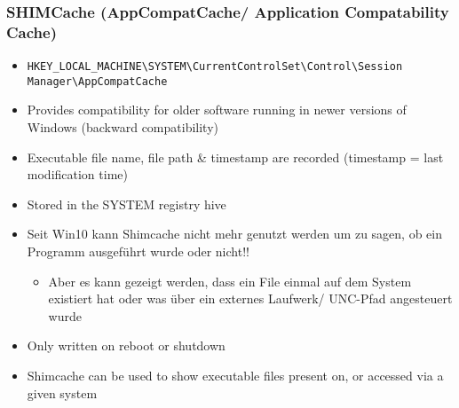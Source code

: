 \subsubsection{SHIMCache (AppCompatCache/ Application Compatability Cache)}
\begin{itemize}
    \item \lstinline|HKEY_LOCAL_MACHINE\SYSTEM\CurrentControlSet\Control\Session Manager\AppCompatCache|
    \item Provides compatibility for older software running in newer versions of Windows (backward compatibility)
    \item Executable file name, file path \& timestamp are recorded (timestamp = last modification time)
    \item Stored in the SYSTEM registry hive
    \item Seit Win10 kann Shimcache nicht mehr genutzt werden um zu sagen, ob ein Programm ausgeführt wurde oder nicht!!
    \begin{itemize}
        \item Aber es kann gezeigt werden, dass ein File einmal auf dem System existiert hat oder was über ein externes Laufwerk/ UNC-Pfad angesteuert wurde
    \end{itemize}
    \item Only written on reboot or shutdown
    \item Shimcache can be used to show executable files present on, or accessed via a given system
\end{itemize}